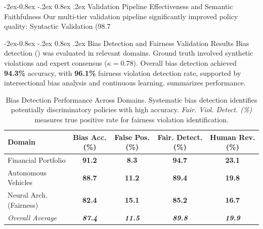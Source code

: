 \documentclass[manuscript,screen,9pt]{acmart}
\makeatletter
\renewcommand\subsubsection{\@startsection{subsubsection}{3}{\z@}%
  {-2ex\@plus -0.8ex \@minus -.2ex}%
  {0.8ex \@plus .2ex}%
  {\normalfont\normalsize\bfseries}}
\newcommand{\tablesize}{\footnotesize}
\newcommand{\tablenumfmt}[1]{\textbf{#1}}
\newcommand{\tableheader}[1]{\textbf{#1}}
\makeatother
\begin{document}
\subsubsection{Validation Pipeline Effectiveness and Semantic Faithfulness}
Our multi-tier validation pipeline significantly improved policy quality: Syntactic Validation (98.7%

\subsubsection{Bias Detection and Fairness Validation Results}
\label{subsubsec:bias_detection_evaluation_results}
Bias detection () was evaluated in relevant domains. Ground truth involved synthetic violations and expert consensus ($\kappa=0.78$). Overall bias detection achieved \textbf{94.3\%} accuracy, with \textbf{96.1\%} fairness violation detection rate, supported by intersectional bias analysis and continuous learning.  summarizes performance.
\begin{table}[htbp]
	\centering
	\caption{Bias Detection Performance Across Domains. Systematic bias detection identifies potentially discriminatory policies with high accuracy. \textit{Fair. Viol. Detect. (\%)} measures true positive rate for fairness violation identification.}
	\label{tab:bias_detection_performance}
	\tablesize
	\begin{tabular}{@{}lcccc@{}}
		\toprule
		\tableheader{Domain}     & \tableheader{Bias Acc. (\%)} & \tableheader{False Pos. (\%)} & \tableheader{Fair. Detect. (\%)} & \tableheader{Human Rev. (\%)} \\
		\midrule
		Financial Portfolio      & \tablenumfmt{91.2}           & \tablenumfmt{8.3}             & \tablenumfmt{94.7}               & \tablenumfmt{23.1}            \\
		Autonomous Vehicles      & \tablenumfmt{88.7}           & \tablenumfmt{11.2}            & \tablenumfmt{89.4}               & \tablenumfmt{19.8}            \\
		Neural Arch. (Fairness)  & \tablenumfmt{82.4}           & \tablenumfmt{15.1}            & \tablenumfmt{85.2}               & \tablenumfmt{16.7}            \\
		\midrule
		\textit{Overall Average} & \textit{\tablenumfmt{87.4}}  & \textit{\tablenumfmt{11.5}}   & \textit{\tablenumfmt{89.8}}      & \textit{\tablenumfmt{19.9}}   \\
		\bottomrule
	\end{tabular}
\end{table}
\end{document}
